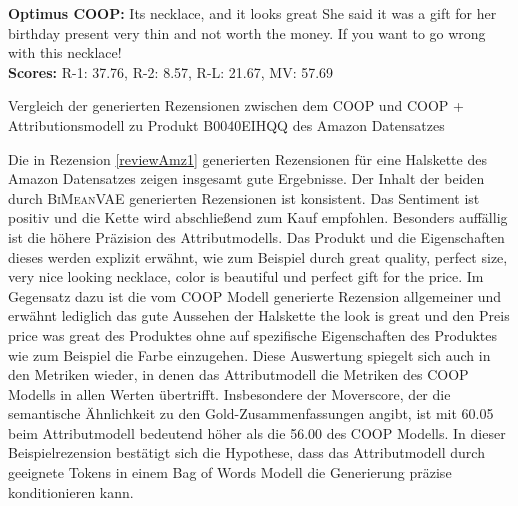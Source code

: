 \begin{Rezension}[!h]
{{        %
        \textbf{Optimus COOP:}  Its \ccolorbox[BackgroundColor]{ \textcolor{HighlightColor}{a beautiful}} \textcolor{HighlightColor}{necklace}\textcolor{HighlightColor}{,} \textcolor{HighlightColor}{and} \textcolor{HighlightColor}{it} looks \textcolor{HighlightColor}{great} \underline{\ccolorbox[BackgroundColor]{ \textcolor{HighlightColor}{for the}} \ccolorbox[BackgroundColor]{ \textcolor{HighlightColor}{price.}}} She said \textcolor{HighlightColor}{it} was \textcolor{HighlightColor}{a} gift \textcolor{HighlightColor}{for} her birthday present\ccolorbox[BackgroundColor]{\textcolor{HighlightColor}{, but}} \ccolorbox[BackgroundColor]{ \textcolor{HighlightColor}{it is}} \textcolor{HighlightColor}{very} \textcolor{HighlightColor}{thin} \textcolor{HighlightColor}{and} not worth \textcolor{HighlightColor}{the} money\textcolor{HighlightColor}{.} If \textcolor{HighlightColor}{you} want \textcolor{HighlightColor}{to} go wrong with \textcolor{HighlightColor}{this} \textcolor{HighlightColor}{necklace}\textcolor{HighlightColor}{!}  \\ 
        \textbf{Scores:} R-1: 37.76, R-2: 8.57, R-L: 21.67, MV: 57.69 }
    
        }
    \caption{Vergleich der generierten Rezensionen zwischen dem COOP und COOP + Attributionsmodell zu Produkt B0040EIHQQ des Amazon Datensatzes}
\label{reviewAmz1}
\end{Rezension}

Die in Rezension \ref{reviewAmz1} generierten Rezensionen für eine Halskette des Amazon Datensatzes zeigen insgesamt gute Ergebnisse.
Der Inhalt der beiden durch \textsc{BiMeanVAE} generierten Rezensionen ist konsistent. 
Das Sentiment ist positiv und die Kette wird abschließend zum Kauf empfohlen. Besonders auffällig ist die höhere Präzision des Attributmodells. Das Produkt und die Eigenschaften dieses werden explizit erwähnt, wie zum Beispiel durch \glqq{}great quality\grqq{}, \glqq{}perfect size\grqq{}, \glqq{}very nice looking necklace\grqq{}, \glqq{}color is beautiful\grqq{} und \glqq{}perfect gift for the price\grqq{}.
Im Gegensatz dazu ist die vom COOP Modell generierte Rezension allgemeiner und erwähnt lediglich das gute Aussehen der Halskette \glqq{}the look is great\grqq{} und den Preis \glqq{}price was great\grqq{} des Produktes ohne auf spezifische Eigenschaften des Produktes wie zum Beispiel die Farbe einzugehen.
Diese Auswertung spiegelt sich auch in den Metriken wieder, in denen das Attributmodell die Metriken des COOP Modells in allen Werten übertrifft. 
Insbesondere der Moverscore, der die semantische Ähnlichkeit zu den Gold-Zusammenfassungen angibt, ist mit 60.05 beim Attributmodell bedeutend höher als die 56.00 des COOP Modells.
In dieser Beispielrezension bestätigt sich die Hypothese, dass das Attributmodell durch geeignete Tokens in einem Bag of Words Modell die Generierung präzise konditionieren kann.

